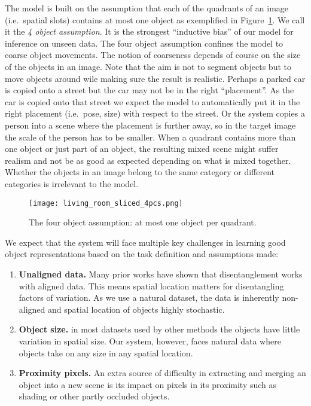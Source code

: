 \documentclass[a4paper,12pt]{report}
\begin{document}
The model is built on the assumption that each of the quadrants of an image (i.e.\ spatial slots) contains at most one object as exemplified in Figure~\ref{fig:livingroom_4quad}. We call it the \textit{4 object assumption}. It is the strongest ``inductive bias'' of our model for inference on unseen data. The four object assumption confines the model to coarse object movements. The notion of coarseness depends of course on the size of the objects in an image. Note that the aim is not to segment objects but to move objects around wile making sure the result is realistic. Perhaps a parked car is copied onto a street but the car may not be in the right ``placement''. As the car is copied onto that street we expect the model to automatically put it in the right placement (i.e.\ pose, size) with respect to the street. Or the system copies a person into a scene where the placement is further away, so in the target image the scale of the person has to be smaller. When a quadrant contains more than one object or just part of an object, the resulting mixed scene might suffer realism and not be as good as expected depending on what is mixed together. Whether the objects in an image belong to the same category or different categories is irrelevant to the model.
\begin{figure}[ht]
\centering
\texttt{[image: living\_room\_sliced\_4pcs.png]}
\caption{The four object assumption: at most one object per quadrant.}
\label{fig:livingroom_4quad}
\end{figure}

We expect that the system will face multiple key challenges in learning good object representations based on the task definition and assumptions made:
\begin{enumerate}
  \item \textbf{Unaligned data.} Many prior works have shown that disentanglement works with aligned data. This means spatial location matters for disentangling factors of variation. As we use a natural dataset, the data is inherently non-aligned and spatial location of objects highly stochastic.
  \item  \textbf{Object size.} in most datasets used by other methods the objects have little variation in spatial size. Our system, however, faces natural data where objects take on any size in any spatial location.
  \item \textbf{Proximity pixels.} An extra source of difficulty in extracting and merging an object into a new scene is its impact on pixels in its proximity such as shading or other partly occluded objects.
\end{enumerate}
\end{document}
